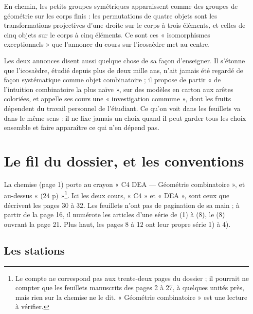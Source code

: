 \documentclass[11pt,a4paper]{article}
\begin{document}
\begin{resume}
En chemin, les petits groupes symétriques apparaissent comme des groupes de
géométrie sur les corps finis : les permutations de quatre objets sont les
transformations projectives d'une droite sur le corps à trois éléments, et
celles de cinq objets sur le corps à cinq éléments. Ce sont ces
« isomorphismes exceptionnels » que l'annonce du cours sur l'icosaèdre met au
centre.

Les deux annonces disent aussi quelque chose de sa façon d'enseigner. Il
s'étonne que l'icosaèdre, étudié depuis plus de deux mille ans, n'ait jamais
été regardé de façon systématique comme objet combinatoire ; il propose de
partir « de l'intuition combinatoire la plus naïve », sur des modèles en carton
aux arêtes coloriées, et appelle ses cours une « investigation commune », dont
les fruits dépendent du travail personnel de l'étudiant. Ce qu'on voit dans les
feuillets va dans le même sens : il ne fixe jamais un choix quand il peut
garder tous les choix ensemble et faire apparaître ce qui n'en dépend pas.

\end{resume}

\section*{Le fil du dossier, et les conventions}

La chemise (page 1) porte au crayon « C4 DEA --- Géométrie combinatoire », et
au-dessus « (24 p) »\footnote{Le compte ne correspond pas aux trente-deux pages
du dossier ; il pourrait ne compter que les feuillets manuscrits des pages 2 à
27, à quelques unités près, mais rien sur la chemise ne le dit. « Géométrie
combinatoire » est une lecture à vérifier.}. Ici les deux cours, « C4 » et « DEA », sont ceux que décrivent les
pages 30 à 32. Les feuillets n'ont pas de pagination de sa main ; à partir de
la page 16, il numérote les articles d'une série de (1) à (8), le (8) ouvrant
la page 21. Plus haut, les pages 8 à 12 ont leur propre série 1) à 4).

\subsection*{Les stations}
\end{document}
